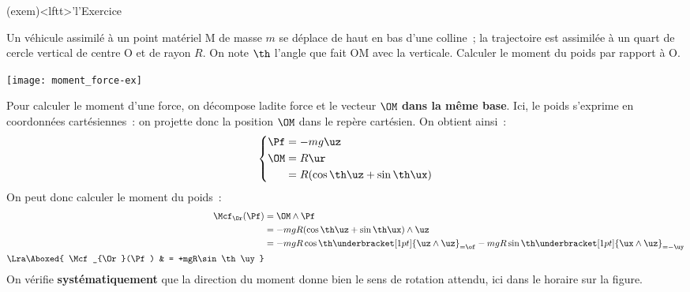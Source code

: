 \documentclass[../../main/main.tex]{subfiles}
\begin{document}
\begin{tcb*}(exem)<lftt>'l'{Exercice}
	\begin{minipage}[c]{0.70\linewidth}
		Un véhicule assimilé à un point matériel M de masse $m$ se déplace de
		haut en bas d’une colline~; la trajectoire est assimilée à un quart de
		cercle vertical de centre O et de rayon $R$. On note $\th$ l’angle que
		fait OM avec la verticale. Calculer le moment du poids par rapport à O.
	\end{minipage}
	\hfill
	\begin{minipage}{0.25\linewidth}
		\begin{center}
			\texttt{[image: moment\_force-ex]}
		\end{center}
	\end{minipage}
	\tcblower
	Pour calculer le moment d'une force, on décompose ladite force et le vecteur
	$\OM$ \textbf{dans la même base}. Ici, le poids s'exprime en coordonnées
	cartésiennes~: on projette donc la position $\OM$ dans le repère cartésien.
	On obtient ainsi~:
	\begin{gather*}
		\left\{
		\begin{aligned}
			\Pf & = -mg\uz                     \\
			\OM & = R\ur                       \\
			    & = R(\cos\th\uz + \sin\th\ux)
		\end{aligned}
		\right.
	\end{gather*}
	On peut donc calculer le moment du poids~:
	\begin{align*}
		\Mcf_{\Or}(\Pf) & = \OM\wedge\Pf                                       \\
		                & = -mgR(\cos\th\uz + \sin\th\ux)\wedge\uz             \\
		                & = -mgR\cos\th\underbracket[1pt]{\uz\wedge\uz}_{=\of}
		-mgR\sin\th\underbracket[1pt]{\ux\wedge\uz}_{=-\uy}                    \\
		\Lra
		\Aboxed{
		\Mcf_{\Or}(\Pf) & = +mgR\sin\th\uy
		}
	\end{align*}
	On vérifie \textbf{systématiquement} que la direction du moment donne bien
	le sens de rotation attendu, ici dans le horaire sur la figure.
\end{tcb*}
\end{document}

